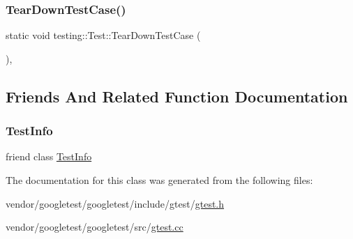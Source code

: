 \subsubsection{\texorpdfstring{Tear\+Down\+Test\+Case()}{TearDownTestCase()}}
{\footnotesize\ttfamily static void testing\+::\+Test\+::\+Tear\+Down\+Test\+Case (\begin{DoxyParamCaption}{ }\end{DoxyParamCaption})\hspace{0.3cm}{\ttfamily [inline]}, {\ttfamily [static]}}



\subsection{Friends And Related Function Documentation}
\mbox{\label{classtesting_1_1_test_a4c49c2cdb6c328e6b709b4542f23de3c}} 
\subsubsection{\texorpdfstring{Test\+Info}{TestInfo}}
{\footnotesize\ttfamily friend class \hyperlink{classtesting_1_1_test_info}{Test\+Info}\hspace{0.3cm}{\ttfamily [friend]}}



The documentation for this class was generated from the following files\+:\begin{DoxyCompactItemize}
\item 
vendor/googletest/googletest/include/gtest/\hyperlink{gtest_8h}{gtest.\+h}\item 
vendor/googletest/googletest/src/\hyperlink{gtest_8cc}{gtest.\+cc}\end{DoxyCompactItemize}
